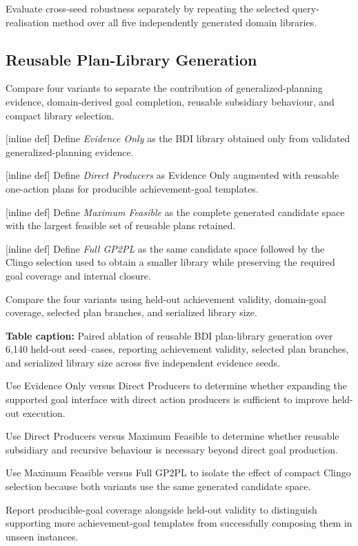 Evaluate cross-seed robustness separately by repeating the selected query-realisation method over all five independently generated domain libraries.


\subsection{Reusable Plan-Library Generation}

Compare four variants to separate the contribution of generalized-planning evidence, domain-derived goal completion, reusable subsidiary behaviour, and compact library selection.

[inline def] Define \emph{Evidence Only} as the BDI library obtained only from validated generalized-planning evidence.

[inline def] Define \emph{Direct Producers} as Evidence Only augmented with reusable one-action plans for producible achievement-goal templates.

[inline def] Define \emph{Maximum Feasible} as the complete generated candidate space with the largest feasible set of reusable plans retained.

[inline def] Define \emph{Full GP2PL} as the same candidate space followed by the Clingo selection used to obtain a smaller library while preserving the required goal coverage and internal closure.

Compare the four variants using held-out achievement validity, domain-goal coverage, selected plan branches, and serialized library size.

\textbf{Table caption:} Paired ablation of reusable BDI plan-library generation over 6,140 held-out seed--cases, reporting achievement validity, selected plan branches, and serialized library size across five independent evidence seeds.

Use Evidence Only versus Direct Producers to determine whether expanding the supported goal interface with direct action producers is sufficient to improve held-out execution.

Use Direct Producers versus Maximum Feasible to determine whether reusable subsidiary and recursive behaviour is necessary beyond direct goal production.

Use Maximum Feasible versus Full GP2PL to isolate the effect of compact Clingo selection because both variants use the same generated candidate space.

Report producible-goal coverage alongside held-out validity to distinguish supporting more achievement-goal templates from successfully composing them in unseen instances.


